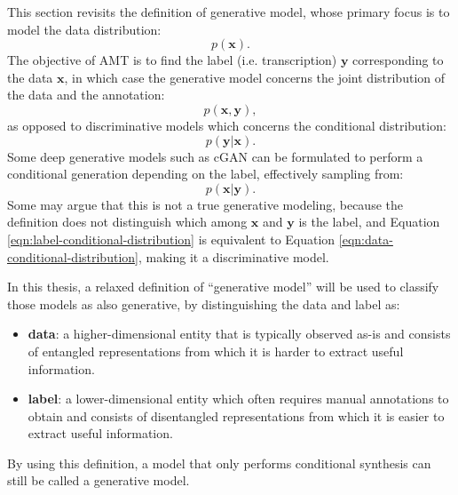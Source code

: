 This section revisits the definition of generative model, whose primary focus is to model the data distribution:
\begin{equation}\label{eqn:data-distribution}
p(\mathbf{x}).
\end{equation}
The objective of AMT is to find the label (i.e. transcription) $\mathbf{y}$ corresponding to the data $\mathbf{x}$, in which case the generative model concerns the joint distribution of the data and the annotation:
\begin{equation}\label{eqn:joint-distribution}
p(\mathbf{x}, \mathbf{y}),
\end{equation}
as opposed to discriminative models which concerns the conditional distribution:
\begin{equation}\label{eqn:data-conditional-distribution}
p(\mathbf{y} | \mathbf{x}).
\end{equation}
Some deep generative models such as cGAN \cite{mirza2014conditional} can be formulated to perform a conditional generation depending on the label, effectively sampling from:
\begin{equation}\label{eqn:label-conditional-distribution}
p(\mathbf{x} | \mathbf{y}).
\end{equation}
Some may argue that this is not a true generative modeling, because the definition does not distinguish which among $\mathbf{x}$ and $\mathbf{y}$ is the label, and Equation \ref{eqn:label-conditional-distribution} is equivalent to Equation \ref{eqn:data-conditional-distribution}, making it a discriminative model.

In this thesis, a relaxed definition of ``generative model'' will be used to classify those models as also generative, by distinguishing the data and label as:
\begin{itemize}
	\item \textbf{data}: a higher-dimensional entity that is typically observed as-is and consists of entangled representations from which it is harder to extract useful information.
	\item \textbf{label}: a lower-dimensional entity which often requires manual annotations to obtain and consists of disentangled representations from which it is easier to extract useful information.
\end{itemize}
By using this definition, a model that only performs conditional synthesis can still be called a generative model.


